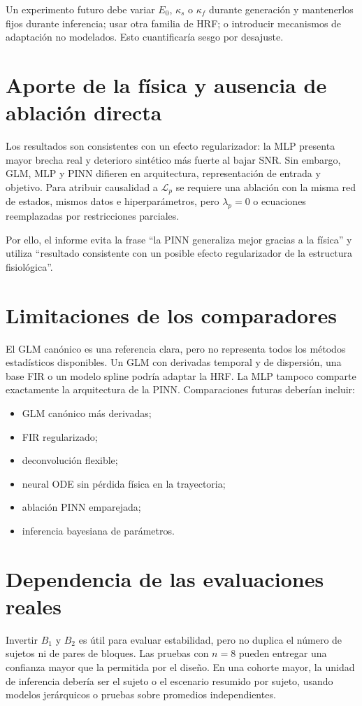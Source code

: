 Un experimento futuro debe variar $E_0$, $\kappa_s$ o $\kappa_f$ durante generación y mantenerlos fijos durante inferencia; usar otra familia de HRF; o introducir mecanismos de adaptación no modelados. Esto cuantificaría sesgo por desajuste.

\section{Aporte de la física y ausencia de ablación directa}
Los resultados son consistentes con un efecto regularizador: la MLP presenta mayor brecha real y deterioro sintético más fuerte al bajar SNR. Sin embargo, GLM, MLP y PINN difieren en arquitectura, representación de entrada y objetivo. Para atribuir causalidad a $\mathcal L_p$ se requiere una ablación con la misma red de estados, mismos datos e hiperparámetros, pero $\lambda_p=0$ o ecuaciones reemplazadas por restricciones parciales.

Por ello, el informe evita la frase ``la PINN generaliza mejor gracias a la física'' y utiliza ``resultado consistente con un posible efecto regularizador de la estructura fisiológica''.

\section{Limitaciones de los comparadores}
El GLM canónico es una referencia clara, pero no representa todos los métodos estadísticos disponibles. Un GLM con derivadas temporal y de dispersión, una base FIR o un modelo spline podría adaptar la HRF. La MLP tampoco comparte exactamente la arquitectura de la PINN. Comparaciones futuras deberían incluir:
\begin{itemize}
  \item GLM canónico más derivadas;
  \item FIR regularizado;
  \item deconvolución flexible;
  \item neural ODE sin pérdida física en la trayectoria;
  \item ablación PINN emparejada;
  \item inferencia bayesiana de parámetros.
\end{itemize}

\section{Dependencia de las evaluaciones reales}
Invertir $B_1$ y $B_2$ es útil para evaluar estabilidad, pero no duplica el número de sujetos ni de pares de bloques. Las pruebas con $n=8$ pueden entregar una confianza mayor que la permitida por el diseño. En una cohorte mayor, la unidad de inferencia debería ser el sujeto o el escenario resumido por sujeto, usando modelos jerárquicos o pruebas sobre promedios independientes.

